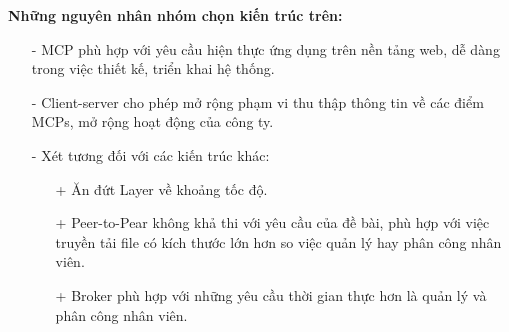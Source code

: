 	\quad \textbf{Những nguyên nhân nhóm chọn kiến trúc trên:}
	\begin{enumerate}
		\item[-] MCP phù hợp với yêu cầu hiện thực ứng dụng trên nền tảng web, dễ dàng trong việc thiết kế, triển khai hệ thống.
		\item[-] Client-server cho phép mở rộng phạm vi thu thập thông tin về các điểm MCPs, mở rộng hoạt động của công ty.
		\item[-] Xét tương đối với các kiến trúc khác:
		\begin{enumerate}
			\item[+] Ăn đứt Layer về khoảng tốc độ.
			\item[+] Peer-to-Pear không khả thi với yêu cầu của đề bài, phù hợp với việc truyền tải file có kích thước lớn hơn so việc quản lý hay phân công nhân viên.
			\item[+] Broker phù hợp với những yêu cầu thời gian thực hơn là quản lý và phân công nhân viên. 
		\end{enumerate}
	\end{enumerate}
  
